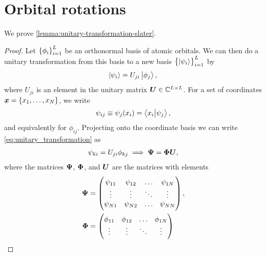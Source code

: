     \section{Orbital rotations}
        \label{sec:orbital-rotations}
        We prove \autoref{lemma:unitary-transformation-slater}.
        \begin{proof}
            Let $\left\{ \phi_i \right\}_{i = 1}^{L}$ be an orthonormal basis of
            atomic orbitals.
            We can then do a unitary transformation from this basis to a new
            basis $\left\{ \ket{\psi_i} \right\}_{i = 1}^{L}$ by
            \begin{align}
                \ket{\psi_i} = U_{ji}\ket{\phi_j},
                \label{eq:unitary_transformation}
            \end{align}
            where $U_{ji}$ is an element in the unitary matrix $\boldsymbol{U} \in
            \mathbb{C}^{L \times L}$.
            For a set of coordinates $\boldsymbol{x} = \left\{ x_1, \dots, x_N \right\}$, we
            write
            \begin{align}
                \psi_{ij} \equiv \psi_j(x_i)
                = \braket{x_i}{\psi_j},
            \end{align}
            and equivalently for $\phi_{ij}$. Projecting onto the coordinate
            basis we can write \autoref{eq:unitary_transformation} as
            \begin{gather}
                \psi_{ki} = U_{ji}\phi_{kj}
                \implies
                \boldsymbol{\Psi} = \boldsymbol{\Phi}\boldsymbol{U},
            \end{gather}
            where the matrices $\boldsymbol{\Psi}$, $\boldsymbol{\Phi}$, and $\boldsymbol{U}$ are
            the matrices with elements
            \begin{align}
                \boldsymbol{\Psi}
                &= \begin{pmatrix}
                    \psi_{11} & \psi_{12} & \dots & \psi_{1N} \\
                    \vdots & \vdots & \ddots & \vdots \\
                    \psi_{N1} & \psi_{N2} & \dots & \psi_{NN}
                \end{pmatrix}, \\
                \boldsymbol{\Phi}
                &= \begin{pmatrix}
                    \phi_{11} & \phi_{12} & \dots & \phi_{1N} \\
                    \vdots & \vdots & \ddots & \vdots \\

\end{pmatrix}
\end{align}
\end{proof}
